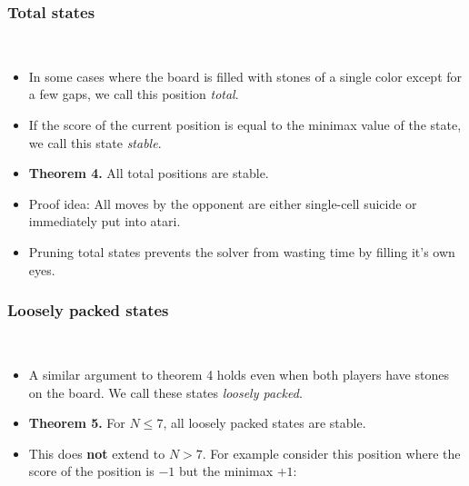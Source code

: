 \documentclass{beamer}
\begin{document}
    \begin{frame}
        \frametitle{Total states}
        \begin{center}
            \cleargoban
            \showgoban[b2,o2]\\\medskip
            \cleargoban
            \showgoban[b2,o2]
        \end{center}
        \begin{itemize}
            \item In some cases where the board is filled with stones of a single color
                except for a few gaps, we call this position \textit{total}.
            \item If the score of the current position is equal to the minimax value of the state,
                we call this state \textit{stable}.
            \pause
            \item \textbf{Theorem 4.} All total positions are stable.
            \item Proof idea: All moves by the opponent are either single-cell suicide or immediately put into atari.
            \item Pruning total states prevents the solver from wasting time by filling it's own eyes.
        \end{itemize}
    \end{frame}

    \begin{frame}
        \frametitle{Loosely packed states}
        \begin{center}
            \cleargoban
            \showgoban[b2,h2]\\\medskip
            \cleargoban
            \showgoban[b2,g2]
        \end{center}
        \begin{itemize}
            \item A similar argument to theorem 4 holds even when both players have stones
                on the board. We call these states \textit{loosely packed}.
            \item \textbf{Theorem 5.} For $N\leq7$, all loosely packed states are stable.
            \pause
            \item This does \textbf{not} extend to $N>7$. For example consider this position
                where the score of the position is $-1$ but the minimax $+1$:
                \begin{center}
                    \cleargoban
                    \showgoban[b2,j2]
                \end{center}
        \end{itemize}
    \end{frame}
\end{document}
